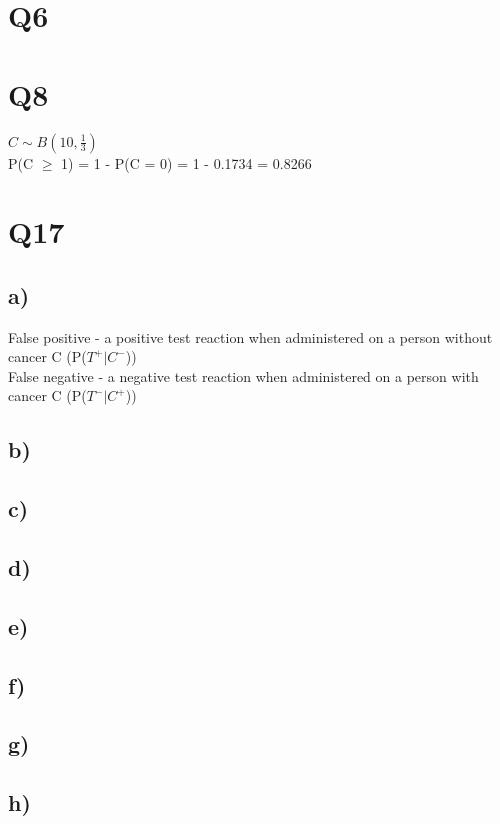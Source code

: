 \documentclass[]{article}
\begin{document}
\section{Q6}

\section{Q8}
$C \sim B(10, \frac{1}{3})$
\\
P(C $\geq$ 1) = 1 - P(C = 0) = 1 - 0.1734 = 0.8266 

\section{Q17}
\subsection{a)}
False positive - a positive test reaction when administered on a person without cancer C (P($T^+|C^-$))
\\
False negative - a negative test reaction when administered on a person with cancer C (P($T^-|C^+$))
\subsection{b)}
\subsection{c)}
\subsection{d)}
\subsection{e)}
\subsection{f)}
\subsection{g)}
\subsection{h)}
\end{document}
